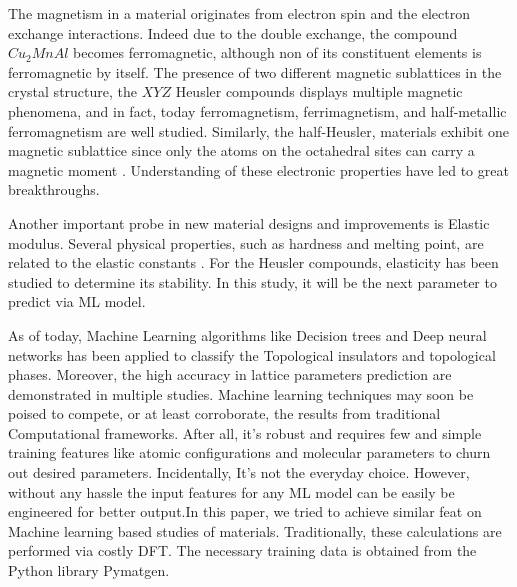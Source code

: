 \documentclass{article}
\begin{document}
The magnetism in a material originates from electron spin and the electron exchange interactions\cite{dietl2009exchange, klitzing:qhe, commins:qhe}. Indeed due to the double exchange, the compound ${Cu_2MnAl}$ becomes ferromagnetic, although non of its constituent elements is ferromagnetic by itself\cite{heusler1903magnetisch}. The presence of two different magnetic sublattices in the crystal structure, the ${XYZ}$ Heusler compounds displays multiple magnetic phenomena, and in fact, today ferromagnetism, ferrimagnetism, and half-metallic ferromagnetism are well studied. Similarly, the half-Heusler, materials exhibit one magnetic sublattice since only the atoms on the octahedral sites can carry a magnetic moment \cite{graf2013magnetic}. Understanding of these electronic properties have led to great breakthroughs. 

Another important probe in new material designs and improvements is Elastic modulus. Several physical properties, such as hardness and melting point, are related to the elastic constants \cite{fine1984elastic, gilman2009chemistry}. For the Heusler compounds, elasticity has been studied to determine its stability\cite{wu2017critical}. In this study, it will be the next parameter to predict via ML model.

As of today, Machine Learning algorithms like Decision trees and Deep neural networks has been applied to classify the Topological insulators\cite{claussen2020detection, andrejevic2020machine} and topological phases\cite{ming2019quantum}. Moreover, the high accuracy in lattice parameters prediction are demonstrated in multiple studies\cite{chonghe2003prediction, jiang2006prediction, zhang2020machine}. Machine learning techniques may soon be poised to compete, or at least corroborate, the results from traditional Computational frameworks. After all, it's robust and requires few and simple training features like atomic configurations and molecular parameters to churn out desired parameters. Incidentally, It's not the everyday choice. However, without any hassle the input features for any ML model can be easily be engineered for better output.In this paper, we tried to achieve similar feat on Machine learning based studies of materials. Traditionally, these calculations are performed via costly DFT. The necessary training data is obtained from the Python library Pymatgen\cite{ong2013python}.



\end{document}
